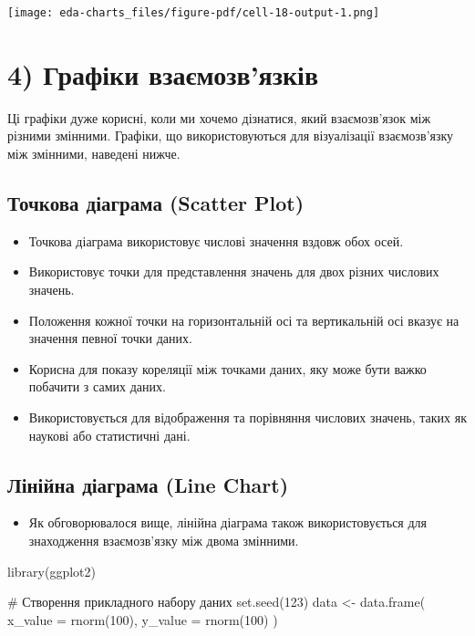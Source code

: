 \documentclass[
  letterpaper,
  DIV=11,
  numbers=noendperiod]{scrreprt}
\newenvironment{Shaded}{\begin{snugshade}}{\end{snugshade}}
\newcommand{\AttributeTok}[1]{\textcolor[rgb]{0.40,0.45,0.13}{#1}}
\newcommand{\CommentTok}[1]{\textcolor[rgb]{0.37,0.37,0.37}{#1}}
\newcommand{\DecValTok}[1]{\textcolor[rgb]{0.68,0.00,0.00}{#1}}
\newcommand{\FunctionTok}[1]{\textcolor[rgb]{0.28,0.35,0.67}{#1}}
\newcommand{\NormalTok}[1]{\textcolor[rgb]{0.00,0.23,0.31}{#1}}
\newcommand{\OtherTok}[1]{\textcolor[rgb]{0.00,0.23,0.31}{#1}}
\providecommand{\tightlist}{%
  \setlength{\itemsep}{0pt}\setlength{\parskip}{0pt}}\usepackage{longtable,booktabs,array}
\begin{document}
\texttt{[image: eda-charts\_files/figure-pdf/cell-18-output-1.png]}

\chapter{4) Графіки
взаємозв'язків}\label{ux433ux440ux430ux444ux456ux43aux438-ux432ux437ux430ux454ux43cux43eux437ux432ux44fux437ux43aux456ux432}

Ці графіки дуже корисні, коли ми хочемо дізнатися, який взаємозв'язок
між різними змінними. Графіки, що використовуються для візуалізації
взаємозв'язку між змінними, наведені нижче.

\section{Точкова діаграма (Scatter
Plot)}\label{ux442ux43eux447ux43aux43eux432ux430-ux434ux456ux430ux433ux440ux430ux43cux430-scatter-plot}

\begin{itemize}
\tightlist
\item
  Точкова діаграма використовує числові значення вздовж обох осей.
\item
  Використовує точки для представлення значень для двох різних числових
  значень.
\item
  Положення кожної точки на горизонтальній осі та вертикальній осі
  вказує на значення певної точки даних.
\item
  Корисна для показу кореляції між точками даних, яку може бути важко
  побачити з самих даних.
\item
  Використовується для відображення та порівняння числових значень,
  таких як наукові або статистичні дані.
\end{itemize}

\section{Лінійна діаграма (Line
Chart)}\label{ux43bux456ux43dux456ux439ux43dux430-ux434ux456ux430ux433ux440ux430ux43cux430-line-chart}

\begin{itemize}
\tightlist
\item
  Як обговорювалося вище, лінійна діаграма також використовується для
  знаходження взаємозв'язку між двома змінними.
\end{itemize}

\begin{Shaded}
\begin{Highlighting}[]
\FunctionTok{library}\NormalTok{(ggplot2)}

\CommentTok{\# Створення прикладного набору даних}
\FunctionTok{set.seed}\NormalTok{(}\DecValTok{123}\NormalTok{)}
\NormalTok{data }\OtherTok{\textless{}{-}} \FunctionTok{data.frame}\NormalTok{(}
  \AttributeTok{x\_value =} \FunctionTok{rnorm}\NormalTok{(}\DecValTok{100}\NormalTok{),}
  \AttributeTok{y\_value =} \FunctionTok{rnorm}\NormalTok{(}\DecValTok{100}\NormalTok{)}
\NormalTok{)}
\end{Highlighting}
\end{Shaded}
\end{document}
